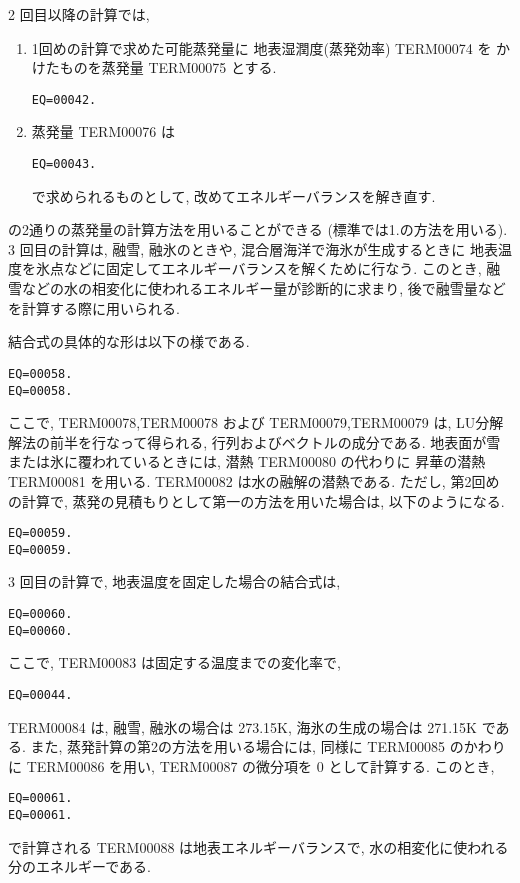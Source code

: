 2 回目以降の計算では, 
\begin{enumerate}
\item 1回めの計算で求めた可能蒸発量に
      地表湿潤度(蒸発効率) TERM00074 を
      かけたものを蒸発量 TERM00075 とする.
      \begin{verbatim}
EQ=00042.
\end{verbatim}

\item 蒸発量 TERM00076 は
      \begin{verbatim}
EQ=00043.
\end{verbatim}
      で求められるものとして, 
      改めてエネルギーバランスを解き直す.
\end{enumerate}
の2通りの蒸発量の計算方法を用いることができる
(標準では1.の方法を用いる).
3 回目の計算は, 融雪, 融氷のときや, 混合層海洋で海氷が生成するときに
地表温度を氷点などに固定してエネルギーバランスを解くために行なう. 
このとき, 融雪などの水の相変化に使われるエネルギー量が診断的に求まり, 
後で融雪量などを計算する際に用いられる. 

結合式の具体的な形は以下の様である. 
%
\begin{verbatim}
EQ=00058.
EQ=00058.
\end{verbatim}
%
ここで, TERM00078,TERM00078 および TERM00079,TERM00079 は, 
LU分解解法の前半を行なって得られる, 行列およびベクトルの成分である. 
地表面が雪または氷に覆われているときには, 潜熱 TERM00080 の代わりに
昇華の潜熱 TERM00081 を用いる. TERM00082 は水の融解の潜熱である. 
%
ただし, 第2回めの計算で, 
蒸発の見積もりとして第一の方法を用いた場合は, 以下のようになる.
\begin{verbatim}
EQ=00059.
EQ=00059.
\end{verbatim}

3 回目の計算で, 地表温度を固定した場合の結合式は, 
\begin{verbatim}
EQ=00060.
EQ=00060.
\end{verbatim}
ここで, TERM00083 は固定する温度までの変化率で, 
\begin{verbatim}
EQ=00044.
\end{verbatim}
TERM00084 は, 融雪, 融氷の場合は 273.15K, 
海氷の生成の場合は 271.15K である. 
また, 蒸発計算の第2の方法を用いる場合には,
同様に TERM00085 のかわりに TERM00086 を用い,
TERM00087 の微分項を 0 として計算する.
このとき, 
\begin{verbatim}
EQ=00061.
EQ=00061.
\end{verbatim}
で計算される TERM00088 は地表エネルギーバランスで, 
水の相変化に使われる分のエネルギーである. 

